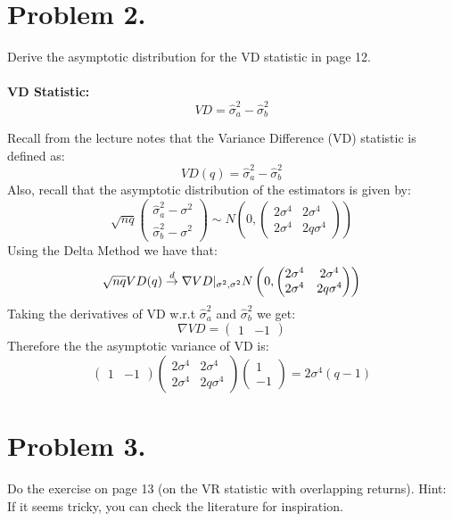 \documentclass[12pt,twoside]{article}
\begin{document}
\section{Problem 2.}
Derive the asymptotic distribution for the VD statistic in page 12. \\\\
\textbf{VD Statistic:}
$$VD = \hat\sigma_a^2 - \hat\sigma_b^2$$ 
\begin{solution}
    Recall from the lecture notes that the Variance Difference (VD) statistic is defined as:
    \[
        VD(q) = \hat\sigma_a^2-\hat\sigma_b^2
    \]
    Also, recall that the asymptotic distribution of the estimators is given by:
    \[
        \sqrt{nq}\begin{pmatrix}\hat\sigma_a^2-\sigma^2 \\ \hat\sigma_b^2- \sigma^2\end{pmatrix} \sim N\left(0, \begin{pmatrix} 2\sigma^4 & 2\sigma^4 \\ 2\sigma^4 & 2q\sigma^4 \end{pmatrix}\right)  
    \]
    Using the Delta Method we have that:
    \[
        \sqrt{nq}VD(q) \overset{d}{\rightarrow} \nabla VD\rvert_{\sigma^2, \sigma^2} N\left(0, \begin{pmatrix} 2\sigma^4 & 2\sigma^4 \\ 2\sigma^4 & 2q\sigma^4 \end{pmatrix}\right)  
    \]
    Taking the derivatives of VD w.r.t \(\hat\sigma_a^2\) and \(\hat\sigma_b^2\) we get:
    \[
        \nabla VD = \begin{pmatrix}
            1 & -1
        \end{pmatrix}
    \]
    Therefore the the asymptotic variance of VD is:
    \[
        \begin{pmatrix}1 & -1\end{pmatrix}\begin{pmatrix} 2\sigma^4 & 2\sigma^4 \\ 2\sigma^4 & 2q\sigma^4 \end{pmatrix}\begin{pmatrix}1 \\ -1\end{pmatrix} = 2\sigma^4(q-1)
    \]
\end{solution}

\newpage

\section{Problem 3.}
Do the exercise on page 13 (on the VR statistic with overlapping returns). Hint: If it seems tricky, you can check the literature for inspiration. \\
\end{document}
